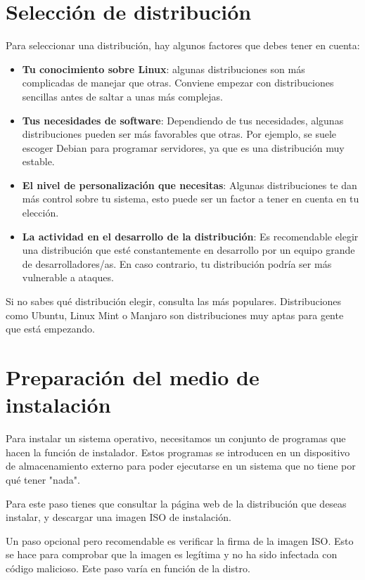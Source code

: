 \section{Selección de distribución}
Para seleccionar una distribución, hay algunos factores que debes tener en cuenta:
\begin{itemize}
    \item \textbf{Tu conocimiento sobre Linux}: algunas distribuciones son más complicadas de manejar que otras. Conviene empezar con distribuciones sencillas antes de saltar a unas más complejas.
    \item \textbf{Tus necesidades de software}: Dependiendo de tus necesidades, algunas distribuciones pueden ser más favorables que otras. Por ejemplo, se suele escoger Debian para programar servidores, ya que es una distribución muy estable.
    \item \textbf{El nivel de personalización que necesitas}: Algunas distribuciones te dan más control sobre tu sistema, esto puede ser un factor a tener en cuenta en tu elección.
    \item \textbf{La actividad en el desarrollo de la distribución}: Es recomendable elegir una distribución que esté constantemente en desarrollo por un equipo grande de desarrolladores/as. En caso contrario, tu distribución podría ser más vulnerable a ataques.
\end{itemize}

Si no sabes qué distribución elegir, consulta las más populares. Distribuciones como Ubuntu, Linux Mint o Manjaro son distribuciones muy aptas para gente que está empezando.

\section{Preparación del medio de instalación}
Para instalar un sistema operativo, necesitamos un conjunto de programas que hacen la función de instalador. Estos programas se introducen en un dispositivo de almacenamiento externo para poder ejecutarse en un sistema que no tiene por qué tener "nada".

Para este paso tienes que consultar la página web de la distribución que deseas instalar, y descargar una imagen ISO de instalación.

Un paso opcional pero recomendable es verificar la firma de la imagen ISO. Esto se hace para comprobar que la imagen es legítima y no ha sido infectada con código malicioso. Este paso varía en función de la distro.

